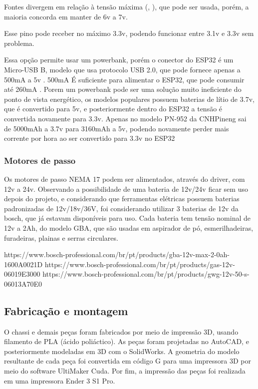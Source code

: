 
Fontes divergem em relação à tensão máxima (\cite{esp32_reference_power_supply_1}, \cite{esp32_reference_power_supply_2}),
que pode ser usada, porém, a maioria concorda em manter de 6v a 7v.

Esse pino pode receber no máximo 3.3v, podendo funcionar entre 3.1v e 3.3v sem problema.

Essa opção permite usar um powerbank, porém o conector do ESP32 é um Micro-USB B, modelo que usa protocolo USB 2.0, que pode fornece apenas a 500mA a 5v \cite{micro_usb_b}.
500mA É suficiente para alimentar o ESP32, que pode consumir até 260mA \cite{esp_max_current}.
Porem um powerbank pode ser uma solução muito ineficiente do ponto de vista energético, os modelos populares possuem baterias de lítio de 3.7v, que é convertido para 5v,
e posteriormente dentro do ESP32 a tensão é convertida novamente para 3.3v. Apenas no modelo PN-952 da CNHPineng sai de 5000mAh a 3.7v  para 3160mAh a 5v,
podendo novamente perder mais corrente por hora ao ser convertido para 3.3v no ESP32

\subsubsection{Motores de passo}

Os motores de passo NEMA 17 podem ser alimentados, através do driver, com 12v a 24v.
Observando a possibilidade de uma bateria de 12v/24v ficar sem uso depois do projeto,
e considerando que ferramentas elétricas possuem baterias padronizadas de 12v/18v/36V, foi considerando utilizar 3 baterias de 12v da bosch, que já estavam disponíveis para uso.
Cada bateria tem tensão nominal de 12v a 2Ah, do modelo GBA, que são usadas em aspirador de pó, esmerilhadeiras, furadeiras, plainas e serras circulares.


https://www.bosch-professional.com/br/pt/products/gba-12v-max-2-0ah-1600A0021D
https://www.bosch-professional.com/br/pt/products/gas-12v-06019E3000
https://www.bosch-professional.com/br/pt/products/gwg-12v-50-s-06013A70E0


\subsection{Fabricação e montagem}
O chassi e demais peças foram fabricados por meio de impressão 3D, usando filamento de PLA (ácido poliáctico). As
peças foram projetadas no AutoCAD, e posteriormente modeladas em 3D com o SolidWorks. A geometria do modelo
resultante de cada peça foi convertida em código G para uma impressora 3D por meio do software UltiMaker Cuda. Por
fim, a impressão das peças foi realizada em uma impressora Ender 3 S1 Pro.



